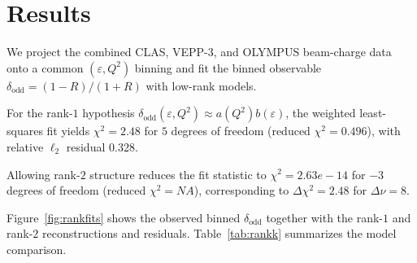 \section{Results}

We project the combined CLAS, VEPP-3, and OLYMPUS beam-charge data onto a common $(\varepsilon,Q^2)$ binning and fit the binned observable $\delta_{\mathrm{odd}}=(1-R)/(1+R)$ with low-rank models.

For the rank-$1$ hypothesis $\delta_{\mathrm{odd}}(\varepsilon,Q^2)\approx a(Q^2)b(\varepsilon)$, the weighted least-squares fit yields $\chi^2=2.48$ for $5$ degrees of freedom (reduced $\chi^2=0.496$), with relative $\ell_2$ residual 0.328.

Allowing rank-$2$ structure reduces the fit statistic to $\chi^2=2.63e-14$ for $-3$ degrees of freedom (reduced $\chi^2=NA$), corresponding to $\Delta\chi^2=2.48$ for $\Delta\nu=8$.

Figure~\ref{fig:rankfits} shows the observed binned $\delta_{\mathrm{odd}}$ together with the rank-$1$ and rank-$2$ reconstructions and residuals. Table~\ref{tab:rankk} summarizes the model comparison.

